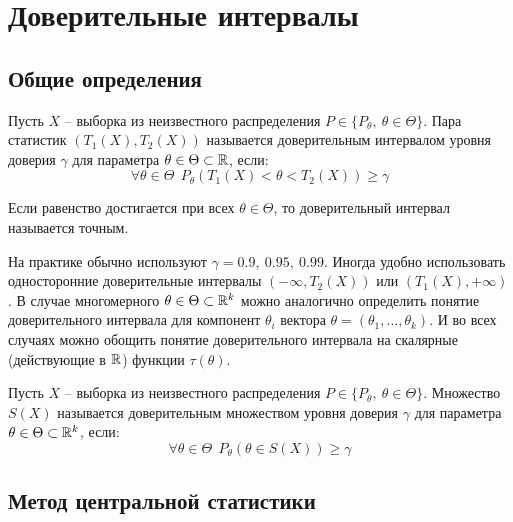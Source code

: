 \section{Доверительные интервалы}

\subsection{Общие определения}

\begin{definition}
    Пусть $X$ -- выборка из неизвестного распределения $P \in \{P_\theta,\ \theta \in \Theta\}$. Пара статистик $(T_1(X), T_2(X))$ называется доверительным интервалом уровня доверия $\gamma$ для параметра $\theta \in \Theta \subset \mathbb{R}$, если:
    \[
        \forall \theta \in \Theta \ \ P_\theta(T_1(X) < \theta < T_2(X)) \ge \gamma
    \]

    Если равенство достигается при всех $\theta \in \Theta$, то доверительный интервал называется точным.
\end{definition}

\begin{note}
    На практике обычно используют $\gamma = 0.9,\ 0.95,\ 0.99$. Иногда удобно использовать односторонние доверительные интервалы $(-\infty, T_2(X))$ или $(T_1(X), +\infty)$. В случае многомерного $\theta \in \Theta \subset \mathbb{R}^k$ можно аналогично определить понятие доверительного интервала для компонент $\theta_i$ вектора $\theta = (\theta_1, \dots, \theta_k)$. И во всех случаях можно обощить понятие доверительного интервала на скалярные (действующие в $\mathbb{R}$) функции $\tau(\theta)$.
\end{note}

\begin{definition}
    Пусть $X$ -- выборка из неизвестного распределения $P \in \{P_\theta,\ \theta \in \Theta\}$. Множество $S(X)$ называется доверительным множеством уровня доверия $\gamma$ для параметра $\theta \in \Theta \subset \mathbb{R}^k$, если:
    \[
        \forall \theta \in \Theta \ \ P_\theta(\theta \in S(X)) \ge \gamma
    \]
\end{definition}

\subsection{Метод центральной статистики}


